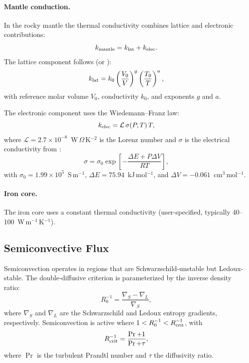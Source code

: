 \documentclass{aastex631}
\begin{document}
\paragraph{Mantle conduction.}
In the rocky mantle the thermal conductivity combines lattice and
electronic contributions:
\begin{equation}\label{eq:k_mantle}
  k_{\rm mantle} = k_{\rm lat} + k_{\rm elec}.
\end{equation}
The lattice component follows \citet{PengDeng2025} (or
\citealt{DengStixrude2021}):
\begin{equation}\label{eq:k_lat}
  k_{\rm lat}
  = k_0\left(\frac{V_0}{V}\right)^g\left(\frac{T_0}{T}\right)^a,
\end{equation}
with reference molar volume $V_0$, conductivity $k_0$, and exponents $g$
and $a$.

The electronic component uses the Wiedemann--Franz law:
\begin{equation}\label{eq:k_elec}
  k_{\rm elec} = \mathcal{L}\,\sigma(P,T)\,T,
\end{equation}
where $\mathcal{L}=2.7\times10^{-8}$~W\,$\Omega$\,K$^{-2}$ is the Lorenz
number and $\sigma$ is the electrical conductivity from
\citet{Holmstrom2018}:
\begin{equation}\label{eq:sigma}
  \sigma = \sigma_0\exp\!\left[
    -\frac{\Delta E + P\Delta V}{RT}
  \right],
\end{equation}
with $\sigma_0=1.99\times10^5$~S\,m$^{-1}$,
$\Delta E=75.94$~kJ\,mol$^{-1}$, and
$\Delta V=-0.061$~cm$^3$\,mol$^{-1}$.

\paragraph{Iron core.}
The iron core uses a constant thermal conductivity (user-specified,
typically 40--100~W\,m$^{-1}$\,K$^{-1}$).

\subsection{Semiconvective Flux}\label{sec:semi}

Semiconvection operates in regions that are Schwarzschild-unstable but
Ledoux-stable.  The double-diffusive criterion is parameterized by the
inverse density ratio:
\begin{equation}\label{eq:R0inv}
  R_0^{-1}
  = \frac{\nabla_S - \nabla_L}{\nabla_S},
\end{equation}
where $\nabla_S$ and $\nabla_L$ are the Schwarzschild and Ledoux entropy
gradients, respectively.  Semiconvection is active where
$1 < R_0^{-1} < R_{\rm crit}^{-1}$, with
\begin{equation}
  R_{\rm crit}^{-1} = \frac{\Pr + 1}{\Pr + \tau},
\end{equation}
where $\Pr$ is the turbulent Prandtl number and $\tau$ the
diffusivity ratio.
\end{document}

